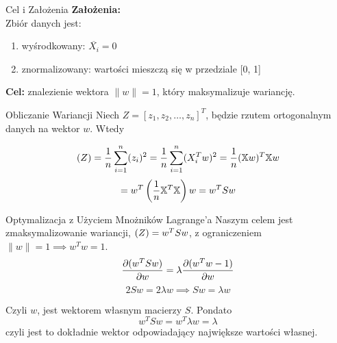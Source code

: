 \documentclass{beamer}
\let\var\relax
\DeclareMathOperator{\var}{var}
\begin{document}
	\begin{frame}{Cel i Założenia}
		\textbf{Założenia:}\\
		Zbiór danych jest: 
		\begin{enumerate}
			\item wyśrodkowany: $\overline{X_i}=0$
			\item znormalizowany: wartości mieszczą się w przedziale [0, 1]
		\end{enumerate}\vspace{20pt}
		
		\textbf{Cel: }znalezienie wektora $\|w\|=1$, który maksymalizuje wariancję.
	\end{frame}
	
	\begin{frame}{Obliczanie Wariancji}
		Niech $Z = [z_1, z_2, \ldots, z_n]^T$, będzie rzutem ortogonalnym danych na wektor $w$. Wtedy
		
		\begin{equation*}
			\var(Z) = \frac{1}{n}\sum_{i=1}^{n}(z_i)^2 = \frac{1}{n}\sum_{i=1}^{n}(X_i^T w)^2 = \frac{1}{n} (\mathbb{X}w)^T\mathbb{X}w 
		\end{equation*}
		\begin{equation*}
			= w^T\left( \frac{1}{n} \mathbb{X}^T \mathbb{X} \right) w = w^T S {}w
			\vspace{2.5mm}
		\end{equation*}
		
	\end{frame}

	
	\begin{frame}{Optymalizacja z Użyciem Mnożników Lagrange'a}
		Naszym celem jest zmaksymalizowanie wariancji, $\var(Z) = w^TSw$, z ograniczeniem $\|w\| = 1 \implies w^Tw = 1$.
		\begin{equation*}
			\pdv{(w^TSw)}{w} = \lambda \pdv{(w^Tw - 1)}{w}
		\end{equation*}
		\begin{equation*}
			2Sw = 2\lambda w \implies Sw=\lambda w
		\end{equation*}
		
		Czyli $w$, jest wektorem własnym macierzy $S$. Pondato
		\begin{equation*}
			w^TSw = w^T\lambda w = \lambda
		\end{equation*}
		czyli jest to dokładnie wektor odpowiadający największe wartości własnej.
	\end{frame}
\end{document}
